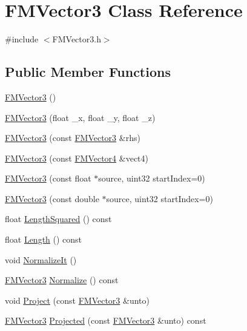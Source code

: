 \hypertarget{classFMVector3}{
\section{FMVector3 Class Reference}
\label{classFMVector3}
}


{\ttfamily \#include $<$FMVector3.h$>$}

\subsection*{Public Member Functions}
\begin{DoxyCompactItemize}
\item 
\hyperlink{classFMVector3_a7cee33ae8a870a7b7e14669fe599461b}{FMVector3} ()
\item 
\hyperlink{classFMVector3_ac4ebdd15669aea066ea5858b8a7deec5}{FMVector3} (float \_\-x, float \_\-y, float \_\-z)
\item 
\hyperlink{classFMVector3_ab99057d6a4d1e5f595cb2ffdb8367d76}{FMVector3} (const \hyperlink{classFMVector3}{FMVector3} \&rhs)
\item 
\hyperlink{classFMVector3_a7d031ab14f2635b737511cb2ac377a2c}{FMVector3} (const \hyperlink{classFMVector4}{FMVector4} \&vect4)
\item 
\hyperlink{classFMVector3_aeda87a2ab88edfd0275cfa9dd196cdc3}{FMVector3} (const float $\ast$source, uint32 startIndex=0)
\item 
\hyperlink{classFMVector3_a6361844cc95f7b488c99bb7b33e70e32}{FMVector3} (const double $\ast$source, uint32 startIndex=0)
\item 
float \hyperlink{classFMVector3_abf0253baa904834ecfc026869f84f634}{LengthSquared} () const 
\item 
float \hyperlink{classFMVector3_a4afad998497b127652eb14048932dd36}{Length} () const 
\item 
void \hyperlink{classFMVector3_a1cf1c273e7462d8b7d07d5795e3abaab}{NormalizeIt} ()
\item 
\hyperlink{classFMVector3}{FMVector3} \hyperlink{classFMVector3_a3d32f0806d047b4a4d34bac48842451b}{Normalize} () const 
\item 
void \hyperlink{classFMVector3_a1fe5b378f95449817837dc0ecadf1ccf}{Project} (const \hyperlink{classFMVector3}{FMVector3} \&unto)
\item 
\hyperlink{classFMVector3}{FMVector3} \hyperlink{classFMVector3_a02d02648049d4acb0868f42bf99ae1c3}{Projected} (const \hyperlink{classFMVector3}{FMVector3} \&unto) const 
\item 

\end{DoxyCompactItemize}
